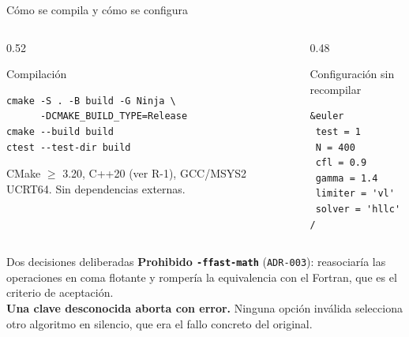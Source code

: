 \documentclass[aspectratio=169,10pt]{beamer}
\newcommand{\cod}[1]{\texttt{\small #1}}
\begin{document}
\begin{frame}[fragile]{Cómo se compila y cómo se configura}

  \begin{columns}[t]
    \begin{column}{0.52\textwidth}
      \begin{block}{Compilación}
\begin{lstlisting}[language={}, keywordstyle=\color{black}]
cmake -S . -B build -G Ninja \
      -DCMAKE_BUILD_TYPE=Release
cmake --build build
ctest --test-dir build
\end{lstlisting}
        \scriptsize
        CMake $\ge$ 3.20, C++20 (ver R-1), GCC/MSYS2 UCRT64.
        Sin dependencias externas.
      \end{block}
    \end{column}
    \begin{column}{0.48\textwidth}
      \begin{block}{Configuración sin recompilar}
\begin{lstlisting}[language={}, keywordstyle=\color{black}]
&euler
 test = 1
 N = 400
 cfl = 0.9
 gamma = 1.4
 limiter = 'vl'
 solver = 'hllc'
/
\end{lstlisting}
      \end{block}
    \end{column}
  \end{columns}

  \begin{alertblock}{Dos decisiones deliberadas}
    \scriptsize
    \textbf{Prohibido \cod{-ffast-math}} (\cod{ADR-003}): reasociaría las
    operaciones en coma flotante y rompería la equivalencia con el Fortran, que es
    el criterio de aceptación.
    \\[2pt]
    \textbf{Una clave desconocida aborta con error.} Ninguna opción inválida
    selecciona otro algoritmo en silencio, que era el fallo concreto del original.
  \end{alertblock}
\end{frame}
\end{document}
